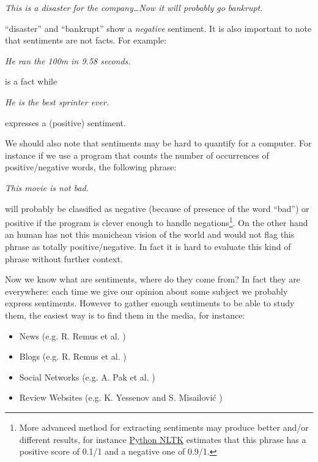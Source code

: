 \documentclass[12pt]{report}
\begin{document}
		\begin{center}
			\emph{This is a {\color{red}disaster} for the company\ldots Now it will probably go {\color{red}bankrupt}.}
		\end{center}

		``{\color{red}disaster}'' and ``{\color{red}bankrupt}'' show a \emph{negative} sentiment. It is also important to note that sentiments are not facts. For example:

		\begin{center}
			\emph{He ran the 100m in 9.58 seconds.}
		\end{center} is a fact while

		\begin{center}
			\emph{He is the best sprinter ever.}
		\end{center}

		expresses a (positive) sentiment.

		We should also note that sentiments may be hard to quantify for a computer. For instance if we use a program that counts the number of occurrences of positive/negative words, the following phrase:

		\begin{center}
			\emph{This movie is not bad.}
		\end{center}

		will probably be classified as negative (because of presence of the word ``bad'') or positive if the program is clever enough to handle negations\footnote{More advanced method for extracting sentiments may produce better and/or different results, for instance \href{http://text-processing.com/demo/sentiment/}{Python NLTK} estimates that this phrase has a positive score of 0.1/1 and a negative one of 0.9/1.}. On the other hand an human has not this manichean vision of the world and would not flag this phrase as totally positive/negative. In fact it is hard to evaluate this kind of phrase without further context.

		Now we know what are sentiments, where do they come from? In fact they are everywhere: each time we give our opinion about some subject we probably express sentiments. However to gather enough sentiments to be able to study them, the easiest way is to find them in the media, for instance:
		\begin{itemize}
			\item News (e.g. R. Remus et al. \cite{remus09})
			\item Blogs (e.g. R. Remus et al. \cite{remus09})
			\item Social Networks (e.g. A. Pak et al. \cite{pak10})
			\item Review Websites (e.g. K. Yessenov and S. Misailovi\'c \cite{yessenov09})
		\end{itemize}
\end{document}
